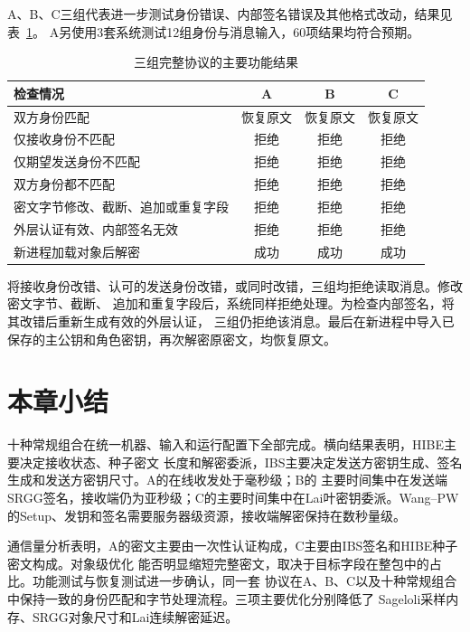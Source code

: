 A、B、C三组代表进一步测试身份错误、内部签名错误及其他格式改动，结果见表~\ref{tab:functional}。
A另使用3套系统测试12组身份与消息输入，60项结果均符合预期。

\begin{table}[H]
\centering\small
\caption{三组完整协议的主要功能结果}
\label{tab:functional}
\begin{tabularx}{\textwidth}{@{}Xccc@{}}
\toprule
\rowcolor{black!8} 检查情况 & A & B & C \\
\midrule
双方身份匹配 & 恢复原文 & 恢复原文 & 恢复原文 \\
仅接收身份不匹配 & 拒绝 & 拒绝 & 拒绝 \\
仅期望发送身份不匹配 & 拒绝 & 拒绝 & 拒绝 \\
双方身份都不匹配 & 拒绝 & 拒绝 & 拒绝 \\
密文字节修改、截断、追加或重复字段 & 拒绝 & 拒绝 & 拒绝 \\
外层认证有效、内部签名无效 & 拒绝 & 拒绝 & 拒绝 \\
新进程加载对象后解密 & 成功 & 成功 & 成功 \\
\bottomrule
\end{tabularx}
\end{table}

将接收身份改错、认可的发送身份改错，或同时改错，三组均拒绝读取消息。修改密文字节、截断、
追加和重复字段后，系统同样拒绝处理。为检查内部签名，将其改错后重新生成有效的外层认证，
三组仍拒绝该消息。最后在新进程中导入已保存的主公钥和角色密钥，再次解密原密文，均恢复原文。

\section{本章小结}

十种常规组合在统一机器、输入和运行配置下全部完成。横向结果表明，HIBE主要决定接收状态、种子密文
长度和解密委派，IBS主要决定发送方密钥生成、签名生成和发送方密钥尺寸。A的在线收发处于毫秒级；B的
主要时间集中在发送端SRGG签名，接收端仍为亚秒级；C的主要时间集中在Lai叶密钥委派。Wang--PW
的Setup、发钥和签名需要服务器级资源，接收端解密保持在数秒量级。

通信量分析表明，A的密文主要由一次性认证构成，C主要由IBS签名和HIBE种子密文构成。对象级优化
能否明显缩短完整密文，取决于目标字段在整包中的占比。功能测试与恢复测试进一步确认，同一套
协议在A、B、C以及十种常规组合中保持一致的身份匹配和字节处理流程。三项主要优化分别降低了
Sageloli采样内存、SRGG对象尺寸和Lai连续解密延迟。
